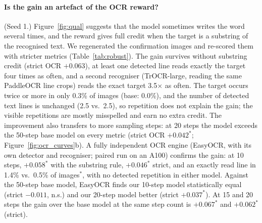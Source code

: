 \documentclass{article}
\begin{document}
\paragraph{Is the gain an artefact of the OCR reward?} (Seed 1.) Figure~\ref{fig:qual} suggests that the model sometimes writes the word
several times, and the reward gives full credit when the target is a substring of the recognised text. We regenerated the
confirmation images and re-scored them with stricter metrics (Table~\ref{tab:robust}). The gain survives without substring
credit (strict OCR $+0.063$), at least one detected line reads exactly the target four times as often, and a second recogniser
(TrOCR-large, reading the same PaddleOCR line crops) reads the exact target 3.5$\times$ as often. The target occurs twice or more
in only 0.3\% of images (base: 0.0\%), and the number of detected text lines is unchanged (2.5 vs.\ 2.5), so repetition does not
explain the gain; the visible repetitions are mostly misspelled and earn no extra credit. The improvement also transfers to
more sampling steps: at 20 steps the model exceeds the 50-step base model on every metric (strict OCR $+0.042^{*}$;
Figure~\ref{fig:ocr_curves}b).
A fully independent OCR engine (EasyOCR, with its own detector and recogniser; paired run on an A100) confirms the gain: at 10 steps, $+0.058^{*}$ with the substring rule, $+0.046^{*}$ strict, and an exactly read line in 1.4\% vs.\ 0.5\% of images$^{*}$, with no detected repetition in either model. Against the 50-step base model, EasyOCR finds our 10-step model statistically equal (strict $-0.011$, n.s.) and our 20-step model better (strict $+0.037^{*}$). At 15 and 20 steps the gain over the base model at the same step count is $+0.067^{*}$ and $+0.062^{*}$ (strict).
\end{document}
